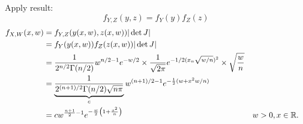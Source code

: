 \documentclass[10pt, a4paper]{article}
\begin{document}
\begin{problem}
\begin{solution}
\begin{enumerate}[label = (\alph*)]
            Apply result:
            \[
            f_{Y, Z}(y, z) = f_{Y}(y)f_{Z}(z)
            \]
            \begin{align*}
                f_{X, W}(x, w) &= f_{Y, Z}(y(x, w), z(x, w))|\det{J}| \\
                &= f_{Y}(y(x, w))f_{Z}(z(x, w))|\det{J}| \\
                &= \frac{1}{2 ^ {n / 2}\Gamma(n / 2)}w ^ {n / 2 - 1}e ^ {-w / 2}\times \frac{1}{\sqrt{2\pi}}e ^ {-1 / 2(x_n\sqrt{w / n}) ^ 2}\times \sqrt{\frac{w}{n}} \\
                &= \underbrace{\frac{1}{2 ^ {(n + 1) / 2}\Gamma(n / 2)\sqrt{n\pi}}}_{c}w ^ {(n + 1) / 2 - 1}e ^ {-\frac{1}{2}(w + x ^ 2w / n)} \\
                &= cw ^ {\frac{n + 1}{2} - 1}e ^ {-\frac{w}{2}\left(1 + \frac{x ^ 2}{n}\right)} && w > 0, x \in \mathbb{R}.
            \end{align*}


\end{enumerate}
\end{solution}
\end{problem}
\end{document}

